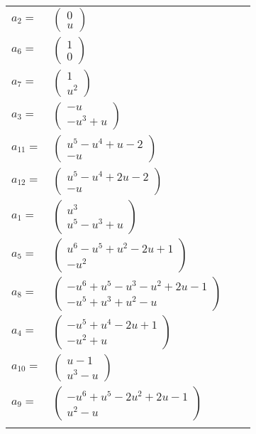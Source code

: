 \documentclass[1p]{elsarticle_modified}
\theoremstyle{definition}
\begin{document}
\begin{tabular}{m{7pt} m{180pt} m{7pt} m{180pt} }
\flushright $a_{2}=$&$\begin{pmatrix}0\\u\end{pmatrix}$ \\
\flushright $a_{6}=$&$\begin{pmatrix}1\\0\end{pmatrix}$ \\
\flushright $a_{7}=$&$\begin{pmatrix}1\\u^2\end{pmatrix}$ \\
\flushright $a_{3}=$&$\begin{pmatrix}- u\\- u^3+u\end{pmatrix}$ \\
\flushright $a_{11}=$&$\begin{pmatrix}u^5- u^4+u-2\\- u\end{pmatrix}$ \\
\flushright $a_{12}=$&$\begin{pmatrix}u^5- u^4+2 u-2\\- u\end{pmatrix}$ \\
\flushright $a_{1}=$&$\begin{pmatrix}u^3\\u^5- u^3+u\end{pmatrix}$ \\
\flushright $a_{5}=$&$\begin{pmatrix}u^6- u^5+u^2-2 u+1\\- u^2\end{pmatrix}$ \\
\flushright $a_{8}=$&$\begin{pmatrix}- u^6+u^5- u^3- u^2+2 u-1\\- u^5+u^3+u^2- u\end{pmatrix}$ \\
\flushright $a_{4}=$&$\begin{pmatrix}- u^5+u^4-2 u+1\\- u^2+u\end{pmatrix}$ \\
\flushright $a_{10}=$&$\begin{pmatrix}u-1\\u^3- u\end{pmatrix}$ \\
\flushright $a_{9}=$&$\begin{pmatrix}- u^6+u^5-2 u^2+2 u-1\\u^2- u\end{pmatrix}$\\&\end{tabular}
\end{document}
